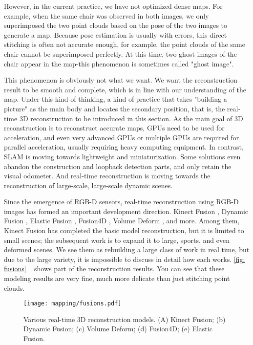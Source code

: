 However, in the current practice, we have not optimized dense maps. For example, when the same chair was observed in both images, we only superimposed the two point clouds based on the pose of the two images to generate a map. Because pose estimation is usually with errors, this direct stitching is often not accurate enough, for example, the point clouds of the same chair cannot be superimposed perfectly. At this time, two ghost images of the chair appear in the map-this phenomenon is sometimes called "ghost image".

This phenomenon is obviously not what we want. We want the reconstruction result to be smooth and complete, which is in line with our understanding of the map. Under this kind of thinking, a kind of practice that takes "building a picture" as the main body and locates the secondary position, that is, the real-time 3D reconstruction to be introduced in this section. As the main goal of 3D reconstruction is to reconstruct accurate maps, GPUs need to be used for acceleration, and even very advanced GPUs or multiple GPUs are required for parallel acceleration, usually requiring heavy computing equipment. In contrast, SLAM is moving towards lightweight and miniaturization. Some solutions even abandon the construction and loopback detection parts, and only retain the visual odometer. And real-time reconstruction is moving towards the reconstruction of large-scale, large-scale dynamic scenes.

Since the emergence of RGB-D sensors, real-time reconstruction using RGB-D images has formed an important development direction. Kinect Fusion \textsuperscript{\cite{Newcombe2011}}, Dynamic Fusion \textsuperscript{\cite{Newcombe2015}} , Elastic Fusion \textsuperscript{\cite{Whelan2015}}, Fusion4D \textsuperscript{\cite{Dou2016}}, Volume Deform \textsuperscript{\cite{Innmann2016}}, and more. Among them, Kinect Fusion has completed the basic model reconstruction, but it is limited to small scenes; the subsequent work is to expand it to large, sports, and even deformed scenes. We see them as rebuilding a large class of work in real time, but due to the large variety, it is impossible to discuss in detail how each works. \autoref{fig: fusions} ~ shows part of the reconstruction results. You can see that these modeling results are very fine, much more delicate than just stitching point clouds.

\begin{figure}[! htp]
\centering
\texttt{[image: mapping/fusions.pdf]}
\caption{Various real-time 3D reconstruction models. (A) Kinect Fusion; (b) Dynamic Fusion; (c) Volume Deform; (d) Fusion4D; (e) Elastic Fusion. }
\label{fig: fusions}
\end{figure}

